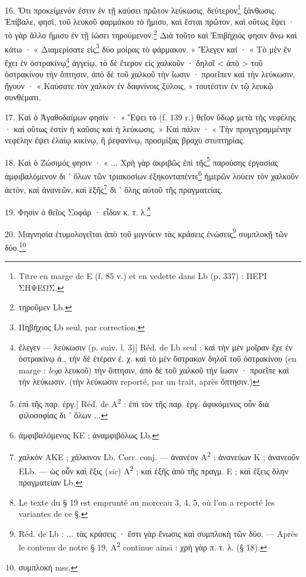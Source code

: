 \documentclass[a4paper, 11pt, oneside, polutonikogreek, french]{article}
\begin{document}
\paragraph{}
16. Ὅτι προκείμενόν ἐστιν ἐν τῇ καύσει πρῶτον λεύκωσις, δεύτερον\footnote{Titre en marge de E (f. 85 v.) et en vedette dans Lb (p. 337) : ΠΕΡΙ ΣΗΨΕΩΣ.} ξάνθωσις. Ἐπίβαλε, φησὶ, τοῦ λευκοῦ φαρμάκου τὸ ἥμισυ, καὶ ἔσται πρῶτον, καὶ οὕτως ἕψει · τὸ γὰρ ἄλλο ἥμισυ ἐν τῇ ἰώσει τηρούμενον.\footnote{τηροῦμεν Lb.} Διὰ τοῦτο καὶ Ἐπιβήχιός φησιν ἄνω καὶ κάτω · « Διαμερίσατε εἰς\footnote{Πηβήχιος Lb seul, par correction.} δύο μοίρας τὸ φάρμακον. » Ἔλεγεν καί · « Τὸ μὲν ἓν ἔχει ἐν ὀστρακίνῳ\footnote{ἔλεγεν --- λεύκωσιν (p. suiv. l. 3)] Réd. de Lb seul : καὶ τὴν μὲν μοῖραν ἔχε ἐν ὀστρακίνῳ ἀ., τὴν δὲ ἑτέραν ἐ. χ. καὶ τὸ μὲν ὄστρακον δηλοῖ τοῦ ὀστρακίνου (en marge : \emph{legο} λευκοῦ) τὴν ὄπτησιν, ἀπὸ δὲ τοῦ χαλκοῦ τὴν ἴωσιν · προεῖπε καὶ τὴν λεύκωσιν. (τὴν λεύκωσιν reporté, par un trait, après ὄπτησιν.)} ἀγγείῳ, τὸ δὲ ἕτερον εἰς χαλκοῦν · δηλοῖ < ἀπὸ > τοῦ ὀστρακίνου τὴν ὄπτησιν, ἀπὸ δὲ τοῦ χαλκοῦ τὴν ἴωσιν · προεῖπεν καὶ τὴν λεύκωσιν, ἤγουν · « Καύσατε τὸν χαλκὸν ἐν δαφνίνοις ξύλοις, » τουτέστιν ἐν τῷ λευκῷ συνθέματι.

17. Καὶ ὁ Ἀγαθοδαίμων φησίν · « Ἕψει τὸ (f. 139 r.) θεῖον ὕδωρ μετὰ τῆς νεφέλης · καὶ οὕτως ἐστὶν ἡ καῦσις καὶ ἡ λεύκωσις. » Καὶ πάλιν · « Τὴν προγεγραμμένην νεφέλην ἕψει ἐλαίῳ κικίνῳ, ἢ ῥεφανίνῳ, προσμίξας βραχὺ στυπτηρίας.

18. Καὶ ὁ Ζώσιμός φησιν · « ... Χρὴ γὰρ ἀκριβῶς ἐπὶ τῆς\footnote{ἐπὶ τῆς παρ. ἐργ.] Réd. de A\textsuperscript{2} : ἐπὶ τὸν τῆς παρ. ἐργ. ἀφικόμενος οὖν διὰ φιλοσοφίας δι ᾽ ὅλων ...} παρούσης ἐργασίας ἀμφιβαλόμενον δι ᾽ ὅλων τῶν τριακοσίων ἐξηκονταπέντε\footnote{ἀμφιβαλόμενος KE ; ἀναμφιβόλως Lb.} ἡμερῶν λούειν τὸν χαλκοῦν ἀετὸν, καὶ ἀνανεῶν, καὶ ἑξῆς\footnote{χαλκὸν AKE ; χάλκινον Lb. Corr. conj. --- ἀνανέον A\textsuperscript{2} ; ἀνανεύων K ; ἀνανεοῦν ELb. --- ὡς οὖν καὶ ἔξις (\emph{sic}) A\textsuperscript{2} ; καὶ ἑξῆς ἀπὸ τῆς πραγμ. E ; καὶ ἕξεις ὅλην πραγματείαν Lb.} δι ᾽ ὅλης αὐτοῦ τῆς πραγματείας.

19. Φησὶν ὁ θεῖος Σοφάρ · εἶδον κ. τ. λ.\footnote{Le texte du § 19 est emprunté au morceau 3, 4, 5, où l'on a reporté les variantes de ce §.}

20. Μαγνησία ἐτυμολογεῖται ἀπὸ τοῦ μιγνύειν τὰς κράσεις ἐνώσεις\footnote{Réd. de Lb : ... τὰς κράσεις · ἔστι γὰρ ἕνωσις καὶ συμπλοκὴ τῶν δύο. --- Après le contenu de notre § 19, A\textsuperscript{2} continue ainsi : χρὴ γὰρ π. τ. λ. (§ 18).} συμπλοκῇ τῶν δύο.\footnote{συμπλοκὴ mss.}
\end{document}
